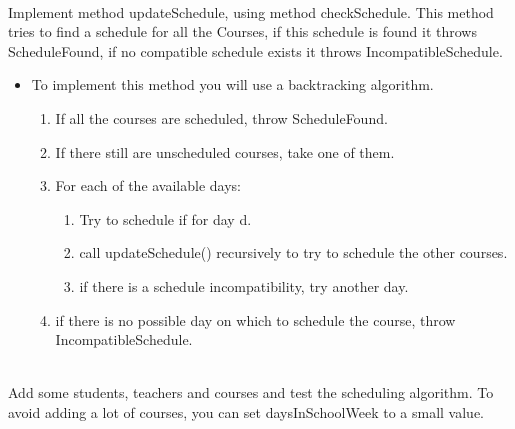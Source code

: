 \documentclass{exercices}
\begin{document}
\begin{exercice}\\
Implement method updateSchedule, using method checkSchedule.
This method tries to find a schedule for all the Courses, if this schedule is found it throws
ScheduleFound, if no compatible schedule exists it throws IncompatibleSchedule.

\begin{itemize}
\item To implement this method you will use a backtracking algorithm. 
\begin{enumerate}
  \item If all the courses are scheduled, throw ScheduleFound.
  \item If there still are unscheduled courses, take one of them.
  \item For each of the available days:
  \begin{enumerate}
    \item Try to schedule if for day d.
    \item call updateSchedule() recursively to try to schedule the other courses.
    \item if there is a schedule incompatibility, try another day.
  \end{enumerate}
  \item if there is no possible day on which to schedule the course, throw IncompatibleSchedule. 
\end{enumerate}
\end{itemize}
\end{exercice}
\begin{exercice}\\
Add some students, teachers and courses and test the scheduling algorithm. 
To avoid adding a lot of courses, you can set daysInSchoolWeek to a small value.
\end{exercice}
\end{document}
